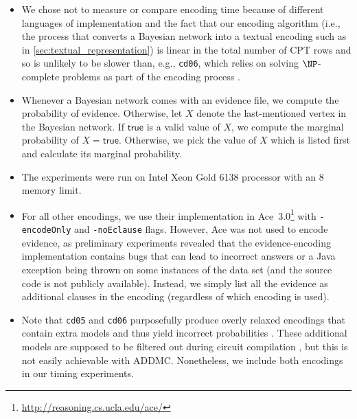 \documentclass{article}
\theoremstyle{definition}
\theoremstyle{remark}
\begin{document}
\begin{itemize}
\item We chose not to measure or compare encoding time because of different
  languages of implementation and the fact that our encoding algorithm (i.e.,
  the process that converts a Bayesian network into a textual encoding such as
  in \cref{sec:textual_representation}) is linear in the total number of CPT
  rows and so is unlikely to be slower than, e.g., \texttt{cd06}, which relies
  on solving $\NP$-complete problems as part of the encoding process
  \cite{DBLP:conf/sat/ChaviraD06}.
\item Whenever a Bayesian network comes with an evidence file, we compute the
  probability of evidence. Otherwise, let $X$ denote the last-mentioned vertex
  in the Bayesian network. If $\mathsf{true}$ is a valid value of $X$, we
  compute the marginal probability of $X = \mathsf{true}$. Otherwise, we pick
  the value of $X$ which is listed first and calculate its marginal probability.
\item The experiments were run on Intel Xeon Gold 6138 processor with an
  \SI{8}{\giga\byte} memory limit.
\item For all other encodings, we use their implementation in
  Ace~3.0\footnote{\url{http://reasoning.cs.ucla.edu/ace/}} with
  \texttt{-encodeOnly} and \texttt{-noEclause} flags. However, Ace was not used
  to encode evidence, as preliminary experiments revealed that the
  evidence-encoding implementation contains bugs that can lead to incorrect
  answers or a Java exception being thrown on some instances of the data set
  (and the source code is not publicly available). Instead, we simply list all
  the evidence as additional clauses in the encoding (regardless of which
  encoding is used).
\item Note that \texttt{cd05} and \texttt{cd06} purposefully produce overly
  relaxed encodings that contain extra models and thus yield incorrect
  probabilities \cite{DBLP:conf/ijcai/ChaviraD05,DBLP:conf/sat/ChaviraD06}.
  These additional models are supposed to be filtered out during circuit
  compilation \cite{DBLP:conf/ijcai/ChaviraD05}, but this is not easily
  achievable with ADDMC. Nonetheless, we include both encodings in our timing
  experiments.
\end{itemize}
\end{document}
